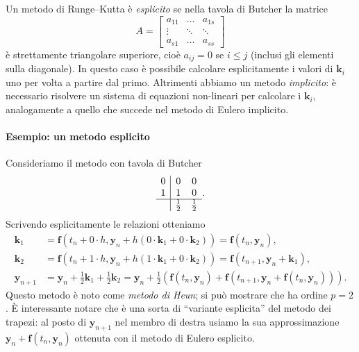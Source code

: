 \documentclass[a4paper]{report}
\theoremstyle{definiton}
\theoremstyle{remark}
\begin{document}
Un metodo di Runge--Kutta è \emph{esplicito} se nella tavola di Butcher la matrice
\[
    A = \begin{bmatrix}
        a_{11} & \dots & a_{1s}\\
        \vdots & \ddots & \ddots\\
        a_{s1} & \dots & a_{ss}
    \end{bmatrix}
\]
è strettamente triangolare superiore, cioè $a_{ij}=0$ se $i \leq j$ (inclusi gli elementi sulla diagonale). In questo caso è possibile calcolare esplicitamente i valori di $\mathbf{k}_i$ uno per volta a partire dal primo. Altrimenti abbiamo un metodo \emph{implicito}: è necessario risolvere un sistema di equazioni non-lineari per calcolare i $\mathbf{k}_i$, analogamente a quello che succede nel metodo di Eulero implicito.

\paragraph{Esempio: un metodo esplicito}
Consideriamo il metodo con tavola di Butcher
\[
\begin{array}{c|cc}
0 & 0 & 0\\
1 & 1 & 0\\
\hline
& \frac12 & \frac12
\end{array}.
\]
Scrivendo esplicitamente le relazioni otteniamo
\begin{align*}
\mathbf{k}_1 &= \mathbf{f}(t_n + 0 \cdot h, \mathbf{y}_n + h(0\cdot \mathbf{k}_1 + 0\cdot \mathbf{k}_2)) = \mathbf{f}(t_n,\mathbf{y}_n),\\
\mathbf{k}_2 &= \mathbf{f}(t_n + 1 \cdot h, \mathbf{y}_n + h(1\cdot \mathbf{k}_1 + 0\cdot \mathbf{k}_2)) = \mathbf{f}(t_{n+1},\mathbf{y}_n+\mathbf{k}_1),\\
\mathbf{y}_{n+1} &= \mathbf{y}_n + \frac12 \mathbf{k}_1 + \frac12 \mathbf{k}_2 = \mathbf{y}_n + \frac12 \left(\mathbf{f}(t_n,\mathbf{y}_n) + \mathbf{f}(t_{n+1},\mathbf{y}_n+ \mathbf{f}(t_n,\mathbf{y}_n))\right).
\end{align*}
Questo metodo è noto come \emph{metodo di Heun}; si può mostrare che ha ordine $p=2$. È interessante notare che è una sorta di ``variante esplicita'' del metodo dei trapezi: al posto di $\mathbf{y}_{n+1}$ nel membro di destra usiamo la sua approssimazione $\mathbf{y}_n+ \mathbf{f}(t_n,\mathbf{y}_n)$ ottenuta con il metodo di Eulero esplicito.
\end{document}
